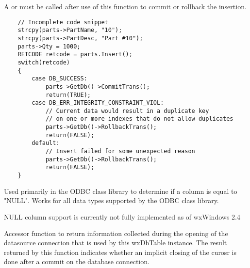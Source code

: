 
A  or 
 must be called after use of 
this function to commit or rollback the insertion.


\begin{verbatim}
    // Incomplete code snippet
    strcpy(parts->PartName, "10");
    strcpy(parts->PartDesc, "Part #10");
    parts->Qty = 1000;
    RETCODE retcode = parts.Insert();
    switch(retcode)
    {
        case DB_SUCCESS:
            parts->GetDb()->CommitTrans();
            return(TRUE);
        case DB_ERR_INTEGRITY_CONSTRAINT_VIOL:
            // Current data would result in a duplicate key
            // on one or more indexes that do not allow duplicates
            parts->GetDb()->RollbackTrans();
            return(FALSE);
        default:
            // Insert failed for some unexpected reason
            parts->GetDb()->RollbackTrans();
            return(FALSE);
    }
\end{verbatim}


\label{wxdbtableiscolnull}


Used primarily in the ODBC class library to determine if a column is equal 
to "NULL".  Works for all data types supported by the ODBC class library.




NULL column support is currently not fully implemented as of wxWindows 2.4


\label{wxdbtableiscursorclosedoncommit}


Accessor function to return information collected during the opening of the 
datasource connection that is used by this wxDbTable instance.  The result 
returned by this function indicates whether an implicit closing of the curosr is 
done after a commit on the database connection.


